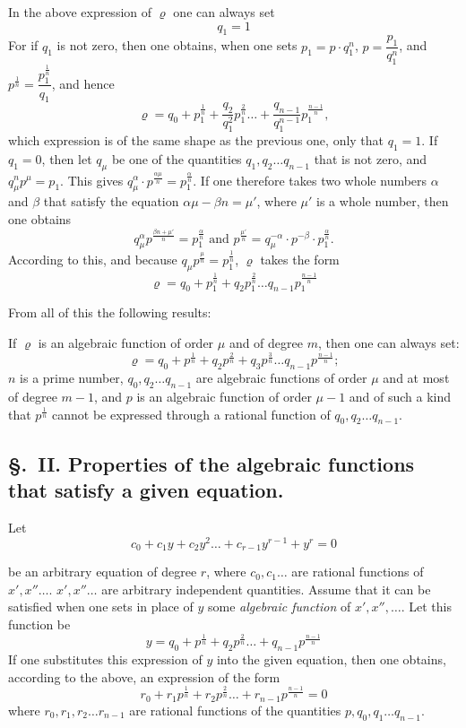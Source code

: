 \documentclass{article}
\begin{document}
In the above expression of $\varrho$ one can always set
\[ q_1 = 1 \]
For if $q_1$ is not zero, then one obtains, when one sets $p_1 = p \cdot q_1^{n}$, $p = \dfrac{p_1}{q_1^{n}}$, and $p^{\frac{1}{n}} = \dfrac{p_1^{\frac{1}{n}}}{q_1}$, and hence
\[ \varrho = q_0 + p_1^{\frac{1}{n}} + \frac{q_2}{q_1^{2}} p_1^{\frac{2}{n}} \ldots + \frac{q_{n-1}}{q_1^{n-1}} p_1^{\frac{n-1}{n}}, \]
which expression is of the same shape as the previous one, only that $q_1 = 1$. If $q_1 = 0$, then let $q_\mu$ be one of the quantities $q_1, q_2 \ldots q_{n-1}$ that is not zero, and $q_\mu^{n} p^{\mu} = p_1$. This gives $q_\mu^{\alpha} \cdot p^{\frac{\alpha\mu}{n}} = p_1^{\frac{\alpha}{n}}$. If one therefore takes two whole numbers $\alpha$ and $\beta$ that satisfy the equation $\alpha\mu - \beta n = \mu'$, where $\mu'$ is a whole number, then one obtains
\[ q_\mu^{\alpha} p^{\frac{\beta n + \mu'}{n}} = p_1^{\frac{\alpha}{n}} \text{ and } p^{\frac{\mu'}{n}} = q_\mu^{-\alpha} \cdot p^{-\beta} \cdot p_1^{\frac{\alpha}{n}}. \]
According to this, and because $q_\mu p^{\frac{\mu}{n}} = p_1^{\frac{1}{n}}$, $\varrho$ takes the form
\[ \varrho = q_0 + p_1^{\frac{1}{n}} + q_2 p_1^{\frac{2}{n}} \ldots q_{n-1} p_1^{\frac{n-1}{n}} \]

From all of this the following results:

If $\varrho$ is an algebraic function of order $\mu$ and of degree $m$, then one can always set:
\[ \varrho = q_0 + p^{\frac{1}{n}} + q_2 p^{\frac{2}{n}} + q_3 p^{\frac{3}{n}} \ldots q_{n-1} p^{\frac{n-1}{n}}; \]
$n$ is a prime number, $q_0, q_2 \ldots q_{n-1}$ are algebraic functions of order $\mu$ and at most of degree $m - 1$, and $p$ is an algebraic function of order $\mu - 1$ and of such a kind that $p^{\frac{1}{n}}$ cannot be expressed through a rational function of $q_0, q_2 \ldots q_{n-1}$.

\subsection*{§.~II. Properties of the algebraic functions that satisfy a given equation.}

Let
\[ c_0 + c_1 y + c_2 y^{2} \ldots + c_{r-1} y^{r-1} + y^{r} = 0 \tag{1} \]

be an arbitrary equation of degree $r$, where $c_0, c_1 \ldots$ are rational functions of $x', x'' \ldots$. $x', x'' \ldots$ are arbitrary independent quantities. Assume that it can be satisfied when one sets in place of $y$ some \emph{algebraic function} of $x', x'', \ldots$. Let this function be
\[ y = q_0 + p^{\frac{1}{n}} + q_2 p^{\frac{2}{n}} \ldots + q_{n-1} p^{\frac{n-1}{n}} \tag{2} \]
If one substitutes this expression of $y$ into the given equation, then one obtains, according to the above, an expression of the form
\[ r_0 + r_1 p^{\frac{1}{n}} + r_2 p^{\frac{2}{n}} \ldots + r_{n-1} p^{\frac{n-1}{n}} = 0 \tag{3} \]
where $r_0, r_1, r_2 \ldots r_{n-1}$ are rational functions of the quantities $p, q_0, q_1 \ldots q_{n-1}$.
\end{document}

